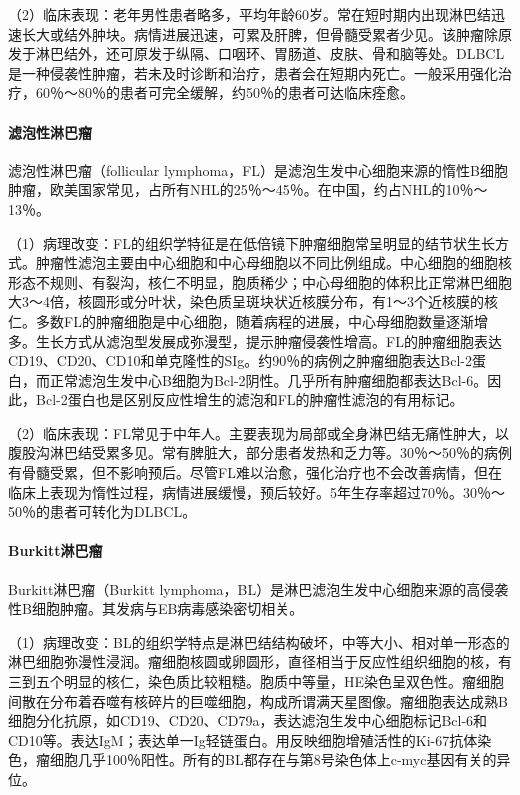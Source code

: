 （2）临床表现：老年男性患者略多，平均年龄60岁。常在短时期内出现淋巴结迅速长大或结外肿块。病情进展迅速，可累及肝脾，但骨髓受累者少见。该肿瘤除原发于淋巴结外，还可原发于纵隔、口咽环、胃肠道、皮肤、骨和脑等处。DLBCL是一种侵袭性肿瘤，若未及时诊断和治疗，患者会在短期内死亡。一般采用强化治疗，60％～80％的患者可完全缓解，约50％的患者可达临床痊愈。

\paragraph{滤泡性淋巴瘤}
滤泡性淋巴瘤（follicular
lymphoma，FL）是滤泡生发中心细胞来源的惰性B细胞肿瘤，欧美国家常见，占所有NHL的25％～45％。在中国，约占NHL的10％～13％。

（1）病理改变：FL的组织学特征是在低倍镜下肿瘤细胞常呈明显的结节状生长方式。肿瘤性滤泡主要由中心细胞和中心母细胞以不同比例组成。中心细胞的细胞核形态不规则、有裂沟，核仁不明显，胞质稀少；中心母细胞的体积比正常淋巴细胞大3～4倍，核圆形或分叶状，染色质呈斑块状近核膜分布，有1～3个近核膜的核仁。多数FL的肿瘤细胞是中心细胞，随着病程的进展，中心母细胞数量逐渐增多。生长方式从滤泡型发展成弥漫型，提示肿瘤侵袭性增高。FL的肿瘤细胞表达CD19、CD20、CD10和单克隆性的SIg。约90％的病例之肿瘤细胞表达Bcl-2蛋白，而正常滤泡生发中心B细胞为Bcl-2阴性。几乎所有肿瘤细胞都表达Bcl-6。因此，Bcl-2蛋白也是区别反应性增生的滤泡和FL的肿瘤性滤泡的有用标记。

（2）临床表现：FL常见于中年人。主要表现为局部或全身淋巴结无痛性肿大，以腹股沟淋巴结受累多见。常有脾脏大，部分患者发热和乏力等。30％～50％的病例有骨髓受累，但不影响预后。尽管FL难以治愈，强化治疗也不会改善病情，但在临床上表现为惰性过程，病情进展缓慢，预后较好。5年生存率超过70％。30％～50％的患者可转化为DLBCL。

\paragraph{Burkitt淋巴瘤}
Burkitt淋巴瘤（Burkitt
lymphoma，BL）是淋巴滤泡生发中心细胞来源的高侵袭性B细胞肿瘤。其发病与EB病毒感染密切相关。

（1）病理改变：BL的组织学特点是淋巴结结构破坏，中等大小、相对单一形态的淋巴细胞弥漫性浸润。瘤细胞核圆或卵圆形，直径相当于反应性组织细胞的核，有三到五个明显的核仁，染色质比较粗糙。胞质中等量，HE染色呈双色性。瘤细胞间散在分布着吞噬有核碎片的巨噬细胞，构成所谓满天星图像。瘤细胞表达成熟B细胞分化抗原，如CD19、CD20、CD79a，表达滤泡生发中心细胞标记Bcl-6和CD10等。表达IgM；表达单一Ig轻链蛋白。用反映细胞增殖活性的Ki-67抗体染色，瘤细胞几乎100％阳性。所有的BL都存在与第8号染色体上c-myc基因有关的异位。

